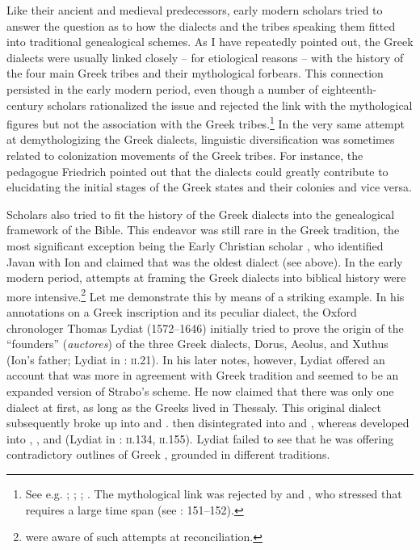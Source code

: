 Like their ancient and medieval predecessors, early modern scholars tried to answer the question as to how the dialects and the tribes speaking them fitted into traditional genealogical schemes. As I have repeatedly pointed out, the Greek dialects were usually linked closely – for etiological reasons – with the history of the four main Greek tribes and their mythological forbears. This connection persisted in the early modern period, even though a number of eighteenth-century scholars rationalized the issue and rejected the link with the mythological figures but not the association with the Greek tribes.\footnote{See e.g. \citet[3--4]{Walper1589}; \citet[166--167]{Labbe1639}; \citet[73]{Vitringa1689}; \citet[\textsc{xxiiii–xxvi}]{Harles1778}. The mythological link was rejected by \citet[\textsc{c.4}\textsc{\textsuperscript{v}}\textsc{–d.1}\textsc{\textsuperscript{r}}]{Thryllitsch1709} and \citet[108--110]{Hemsterhuis2015}, who stressed that  requires a large time span (see \citealt{Gerretzen1940}: 151–152).} In the very same attempt at demythologizing the Greek dialects, linguistic diversification was sometimes related to colonization movements of the Greek tribes. For instance, the  pedagogue Friedrich \citet[12]{Gedike1782} pointed out that the dialects could greatly contribute to elucidating the initial stages of the Greek states and their colonies and vice versa.

Scholars also tried to fit the history of the Greek dialects into the genealogical framework of the Bible. This endeavor was still rare in the Greek tradition, the most significant exception being the Early Christian scholar , who identified Javan with Ion and claimed that  was the oldest dialect (see  above). In the early modern period, attempts at framing the Greek dialects into biblical history were more intensive.\footnote{\citet[\textsc{c.1}\textsc{\textsuperscript{v}}]{Schwartz1702} were aware of such attempts at reconciliation.} Let me demonstrate this by means of a striking example. In his annotations on a Greek inscription and its peculiar dialect, the Oxford chronologer Thomas Lydiat (1572–1646) initially tried to prove the  origin of the “founders” (\textit{auctores}) of the three Greek dialects, Dorus, Aeolus, and Xuthus (Ion’s father; Lydiat in \citealt{Prideaux1676}: \textsc{ii}.21). In his later notes, however, Lydiat offered an account that was more in agreement with Greek tradition and seemed to be an expanded version of Strabo’s scheme. He now claimed that there was only one dialect at first, as long as the Greeks lived in Thessaly. This original dialect subsequently broke up into  and .  then disintegrated into  and , whereas  developed into , , and  (Lydiat in \citealt{Prideaux1676}: \textsc{ii.134}, \textsc{ii.}155). Lydiat failed to see that he was offering contradictory outlines of Greek , grounded in different traditions.

